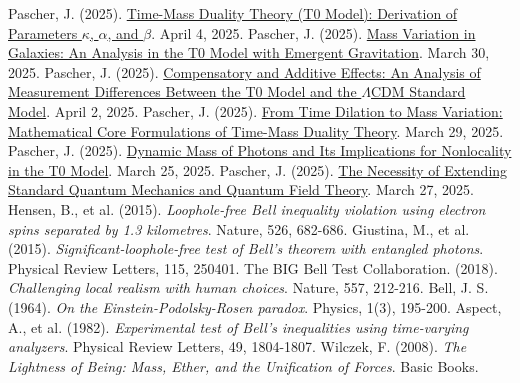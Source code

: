 \documentclass[a4paper,12pt]{article}
\theoremstyle{definition}
\theoremstyle{remark}
\begin{document}
	\begin{thebibliography}{99}
		 Pascher, J. (2025). \href{https://github.com/jpascher/T0-Time-Mass-Duality/tree/main/2/pdf/English/ZeitMasseT0ParamsEn.pdf}{Time-Mass Duality Theory (T0 Model): Derivation of Parameters \(\kappa\), \(\alpha\), and \(\beta\)}. April 4, 2025.
		 Pascher, J. (2025). \href{https://github.com/jpascher/T0-Time-Mass-Duality/tree/main/2/pdf/English/MassVarGalaxienEn.pdf}{Mass Variation in Galaxies: An Analysis in the T0 Model with Emergent Gravitation}. March 30, 2025.
		 Pascher, J. (2025). \href{https://github.com/jpascher/T0-Time-Mass-Duality/tree/main/2/pdf/English/MessdifferenzenT0StandardEn.pdf}{Compensatory and Additive Effects: An Analysis of Measurement Differences Between the T0 Model and the \(\Lambda\)CDM Standard Model}. April 2, 2025.
		 Pascher, J. (2025). \href{https://github.com/jpascher/T0-Time-Mass-Duality/tree/main/2/pdf/English/MathZeitMasseLagrange.pdf}{From Time Dilation to Mass Variation: Mathematical Core Formulations of Time-Mass Duality Theory}. March 29, 2025.
		 Pascher, J. (2025). \href{https://github.com/jpascher/T0-Time-Mass-Duality/tree/main/2/pdf/English/DynMassePhotonenNichtlokalEn.pdf}{Dynamic Mass of Photons and Its Implications for Nonlocality in the T0 Model}. March 25, 2025.
		 Pascher, J. (2025). \href{https://github.com/jpascher/T0-Time-Mass-Duality/tree/main/2/pdf/English/NotwendigkeitQMErweiterungEn.pdf}{The Necessity of Extending Standard Quantum Mechanics and Quantum Field Theory}. March 27, 2025.
		 Hensen, B., et al. (2015). \textit{Loophole-free Bell inequality violation using electron spins separated by 1.3 kilometres}. Nature, 526, 682-686.
		 Giustina, M., et al. (2015). \textit{Significant-loophole-free test of Bell’s theorem with entangled photons}. Physical Review Letters, 115, 250401.
		 The BIG Bell Test Collaboration. (2018). \textit{Challenging local realism with human choices}. Nature, 557, 212-216.
		 Bell, J. S. (1964). \textit{On the Einstein-Podolsky-Rosen paradox}. Physics, 1(3), 195-200.
		 Aspect, A., et al. (1982). \textit{Experimental test of Bell's inequalities using time-varying analyzers}. Physical Review Letters, 49, 1804-1807.
		 Wilczek, F. (2008). \textit{The Lightness of Being: Mass, Ether, and the Unification of Forces}. Basic Books.

\end{thebibliography}
\end{document}
